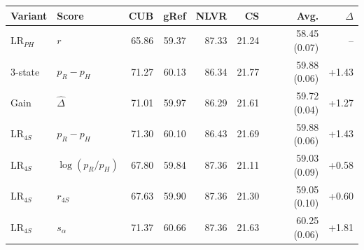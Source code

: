 \centering
{}
\label{tab:objective}
\fontsize{8}{9.5}\selectfont
\setlength{\tabcolsep}{1.5pt}
\begin{tabular}{@{}llrrrrrr@{}}
\toprule
Variant & Score & CUB & gRef & NLVR & CS & Avg. & $\Delta$ \\
\midrule
$\mathrm{LR}_{PH}$ & $r$ & 65.86 & 59.37 & 87.33 & 21.24 & 58.45 (0.07) & -- \\
\midrule
3-state & $p_R-p_H$ & 71.27 & 60.13 & 86.34 & 21.77 & 59.88 (0.06) & \textcolor{upgreen}{+1.43} \\
Gain & $\widehat\Delta$ & 71.01 & 59.97 & 86.29 & 21.61 & 59.72 (0.04) & \textcolor{upgreen}{+1.27} \\
\midrule
$\mathrm{LR}_{4S}$ & $p_R-p_H$ & 71.30 & 60.10 & 86.43 & 21.69 & 59.88 (0.06) & \textcolor{upgreen}{+1.43} \\
$\mathrm{LR}_{4S}$ & $\log(p_R/p_H)$ & 67.80 & 59.84 & 87.36 & 21.11 & 59.03 (0.09) & \textcolor{upgreen}{+0.58} \\
$\mathrm{LR}_{4S}$ & $r_{4S}$ & 67.63 & 59.90 & 87.36 & 21.30 & 59.05 (0.10) & \textcolor{upgreen}{+0.60} \\
\rowcolor{learnfill}
$\mathrm{LR}_{4S}$ & $s_\alpha$ & 71.37 & 60.66 & 87.36 & 21.63 & 60.25 (0.06) & \textcolor{upgreen}{+1.81} \\
\bottomrule
\end{tabular}
